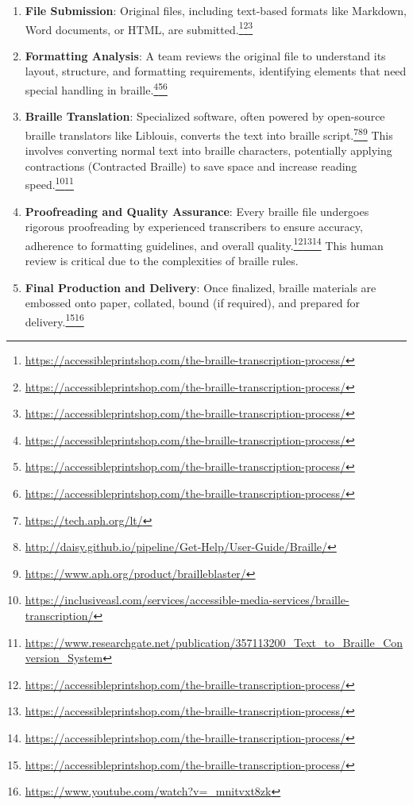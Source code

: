 \begin{enumerate}[noitemsep,topsep=0pt]
    \item \textbf{File Submission}: Original files, including text-based formats like Markdown, Word documents, or HTML, are submitted.\footnote{\url{https://accessibleprintshop.com/the-braille-transcription-process/}}\footnote{\url{https://accessibleprintshop.com/the-braille-transcription-process/}}\footnote{\url{https://accessibleprintshop.com/the-braille-transcription-process/}}
    \item \textbf{Formatting Analysis}: A team reviews the original file to understand its layout, structure, and formatting requirements, identifying elements that need special handling in braille.\footnote{\url{https://accessibleprintshop.com/the-braille-transcription-process/}}\footnote{\url{https://accessibleprintshop.com/the-braille-transcription-process/}}\footnote{\url{https://accessibleprintshop.com/the-braille-transcription-process/}}
    \item \textbf{Braille Translation}: Specialized software, often powered by open-source braille translators like Liblouis, converts the text into braille script.\footnote{\url{https://tech.aph.org/lt/}}\footnote{\url{http://daisy.github.io/pipeline/Get-Help/User-Guide/Braille/}}\footnote{\url{https://www.aph.org/product/brailleblaster/}} This involves converting normal text into braille characters, potentially applying contractions (Contracted Braille) to save space and increase reading speed.\footnote{\url{https://inclusiveasl.com/services/accessible-media-services/braille-transcription/}}\footnote{\url{https://www.researchgate.net/publication/357113200_Text_to_Braille_Conversion_System}}
    \item \textbf{Proofreading and Quality Assurance}: Every braille file undergoes rigorous proofreading by experienced transcribers to ensure accuracy, adherence to formatting guidelines, and overall quality.\footnote{\url{https://accessibleprintshop.com/the-braille-transcription-process/}}\footnote{\url{https://accessibleprintshop.com/the-braille-transcription-process/}}\footnote{\url{https://accessibleprintshop.com/the-braille-transcription-process/}} This human review is critical due to the complexities of braille rules.
    \item \textbf{Final Production and Delivery}: Once finalized, braille materials are embossed onto paper, collated, bound (if required), and prepared for delivery.\footnote{\url{https://accessibleprintshop.com/the-braille-transcription-process/}}\footnote{\url{https://www.youtube.com/watch?v=_mnitvxt8zk}}
\end{enumerate}

